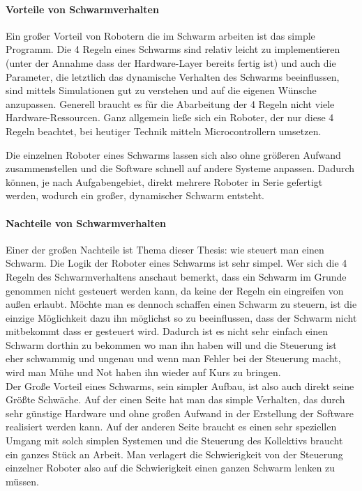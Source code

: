 \paragraph*{Vorteile von Schwarmverhalten}

Ein großer Vorteil von Robotern die im Schwarm arbeiten ist das simple Programm. Die 4 Regeln eines Schwarms sind relativ leicht zu implementieren (unter der Annahme dass der Hardware-Layer bereits fertig ist) und auch die Parameter, die letztlich das dynamische Verhalten des Schwarms beeinflussen, sind mittels Simulationen gut zu verstehen und auf die eigenen Wünsche anzupassen. Generell braucht es für die Abarbeitung der 4 Regeln nicht viele Hardware-Ressourcen. Ganz allgemein ließe sich ein Roboter, der nur diese 4 Regeln beachtet, bei heutiger Technik mitteln Microcontrollern umsetzen.

Die einzelnen Roboter eines Schwarms lassen sich also ohne größeren Aufwand zusammenstellen und die Software schnell auf andere Systeme anpassen. Dadurch können, je nach Aufgabengebiet, direkt mehrere Roboter in Serie gefertigt werden, wodurch ein großer, dynamischer Schwarm entsteht.

\paragraph*{Nachteile von Schwarmverhalten}

Einer der großen Nachteile ist Thema dieser Thesis: wie steuert man einen Schwarm. Die Logik der Roboter eines Schwarms ist sehr simpel. Wer sich die 4 Regeln des Schwarmverhaltens anschaut bemerkt, dass ein Schwarm im Grunde genommen nicht gesteuert werden kann, da keine der Regeln ein eingreifen von außen erlaubt. Möchte man es dennoch schaffen einen Schwarm zu steuern, ist die einzige Möglichkeit dazu ihn möglichst so zu beeinflussen, dass der Schwarm nicht mitbekommt dass er gesteuert wird. Dadurch ist es nicht sehr einfach einen Schwarm dorthin zu bekommen wo man ihn haben will und die Steuerung ist eher schwammig und ungenau und wenn man Fehler bei der Steuerung macht, wird man Mühe und Not haben ihn wieder auf Kurs zu bringen.\\

Der Große Vorteil eines Schwarms, sein simpler Aufbau, ist also auch direkt seine Größte Schwäche. Auf der einen Seite hat man das simple Verhalten, das durch sehr günstige Hardware und ohne großen Aufwand in der Erstellung der Software realisiert werden kann. Auf der anderen Seite braucht es einen sehr speziellen Umgang mit solch simplen Systemen und die Steuerung des Kollektivs braucht ein ganzes Stück an Arbeit. Man verlagert die Schwierigkeit von der Steuerung einzelner Roboter also auf die Schwierigkeit einen ganzen Schwarm lenken zu müssen.

